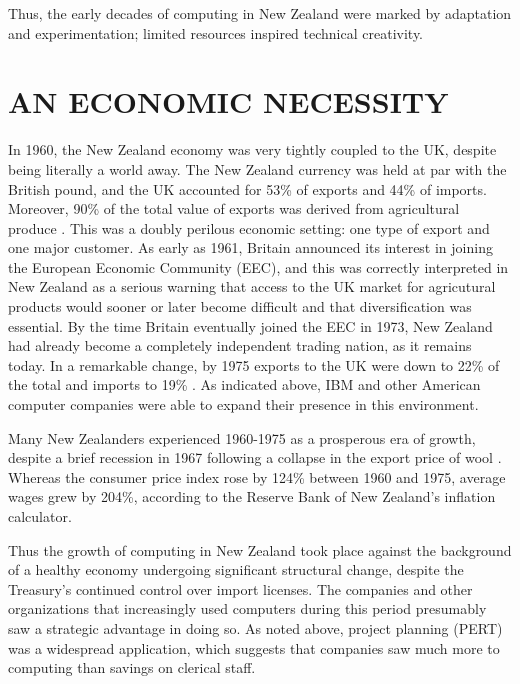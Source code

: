 \documentclass{IEEEcsmag}
\begin{document}
Thus, the early decades of computing in New Zealand were marked by adaptation and experimentation; limited resources inspired technical creativity.
\vspace*{-8pt}
\section{AN ECONOMIC NECESSITY}

In 1960, the New Zealand economy was very tightly coupled to the UK, despite being literally a world away.
The New Zealand currency was held at par with the British pound, and the UK accounted for 53\% of exports and 44\% of imports.
Moreover, 90\% of the total value of exports was derived from agricultural produce \cite{Yearbook62}. 
This was a doubly perilous economic setting: one type of export and one major customer.
As early as 1961, Britain announced its interest in joining the European Economic Community (EEC),
and this was correctly interpreted in New Zealand as a serious warning that access to the UK market 
for agricutural products would sooner or later become difficult and that diversification was essential. By the time
Britain eventually joined the EEC in 1973, New Zealand had already become a completely independent
trading nation, as it remains today. In a remarkable change, by 1975 exports to the UK were down to 22\%
of the total and imports to 19\% \cite{Yearbook77}. 
As indicated above, IBM and other American computer companies were able to expand their presence in this environment.

Many New Zealanders experienced 1960-1975 as a prosperous era of growth,
despite a brief recession in 1967 \cite{Hall-2014} following a collapse in the export price of wool \cite{Easton-2020}.
Whereas the consumer price index rose by 124\% between 1960 and 1975, average wages grew by
204\%, according to the Reserve Bank of New Zealand’s inflation calculator.

Thus the growth of computing in New Zealand took place against the background of a
healthy economy undergoing significant structural change, despite the Treasury’s continued
control over import licenses.
The companies and other organizations that increasingly used computers during this period
presumably saw a strategic advantage in doing so. As noted above, project planning (PERT)
was a widespread application, which suggests that companies saw much more to computing than
savings on clerical staff. 
\end{document}
